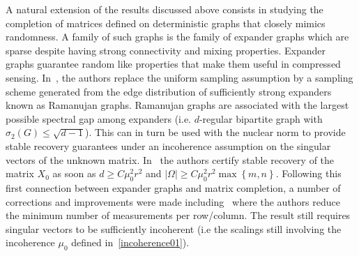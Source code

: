 \documentclass[12pt]{article}
\begin{document}
A natural extension of the results discussed above consists in studying the completion of matrices defined on deterministic graphs that closely mimics randomness.  A family of such graphs is the family of expander graphs which are sparse despite having strong connectivity and mixing properties.  Expander graphs guarantee random like properties that make them useful in compressed sensing.  In~\cite{bhojanapalli2014universal}, the authors replace the uniform sampling assumption by a sampling scheme generated from the edge distribution of sufficiently strong expanders known as Ramanujan graphs.  Ramanujan graphs are associated with the largest possible spectral gap among expanders (i.e.  $d$-regular bipartite graph with $\sigma_2(G)\leq \sqrt{d-1}$). This can in turn be used with the nuclear norm to provide stable recovery guarantees under an incoherence assumption on the singular vectors of the unknown matrix.  In~\cite{bhojanapalli2014universal} the authors certify stable recovery of the matrix $X_0$ as soon as $d\geq C \mu_0^2 r^2$ and $|\Omega|\geq C\mu_0^2 r^2\max \left\{m,n\right\}$.  Following this first connection between expander graphs and matrix completion, a number of corrections and improvements were made including~\cite{burnwal2020deterministic} where the authors reduce the minimum number of measurements per row/column.  The result still requires singular vectors to be sufficiently incoherent (i.e the scalings still involving the incoherence $\mu_0$ defined in~\eqref{incoherence01}).  
\end{document}
